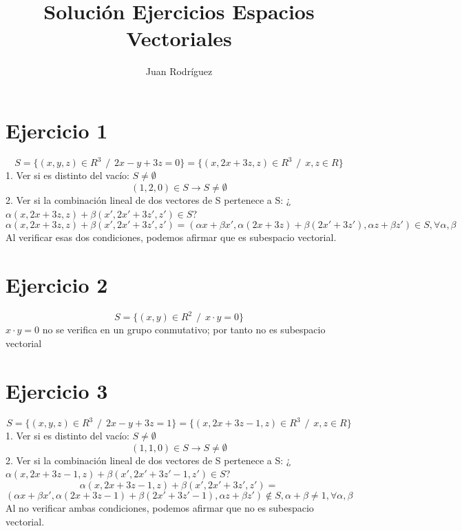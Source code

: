 \documentclass[fleqn]{article}
\title{Solución Ejercicios Espacios Vectoriales}
\author{Juan Rodríguez}
\begin{document}
	\maketitle
	\section{Ejercicio 1}
	\[
	S = \{(x,y,z)\in R^3 \hspace{5pt}/\hspace{5pt}2x - y + 3z = 0\} = \{(x,2x + 3z,z)\in R^3 \hspace{5pt}/\hspace{5pt}x,z \in R\}
	\]
	1. Ver si es distinto del vacío: $S \neq \emptyset$
	\[
	(1,2,0) \in S \rightarrow S \neq \emptyset 
	\]
	2. Ver si la combinación lineal de dos vectores de S pertenece a S: ¿$\alpha(x,2x+3z,z) + \beta(x',2x'+3z',z') \in S$?
	\[
	\alpha(x,2x+3z,z) + \beta(x',2x'+3z',z') = (\alpha x + \beta x', \alpha (2x+3z)+\beta(2x'+3z'),\alpha z + \beta z') \in S, \forall \alpha , \beta
	\]
	Al verificar esas dos condiciones, podemos afirmar que es subespacio vectorial.
	\section{Ejercicio 2}
	\[
	S = \{(x,y)\in R^2 \hspace{5pt}/\hspace{5pt}x \cdot y = 0\}
	\]
	$x \cdot y = 0$ no se verifica en un grupo conmutativo; por tanto no es subespacio vectorial
	\section{Ejercicio 3}
	\[
	S = \{(x,y,z)\in R^3 \hspace{5pt}/\hspace{5pt}2x - y + 3z = 1\} = \{(x,2x + 3z - 1,z)\in R^3 \hspace{5pt}/\hspace{5pt}x,z \in R\}
	\]
	1. Ver si es distinto del vacío: $S \neq \emptyset$
	\[
	(1,1,0) \in S \rightarrow S \neq \emptyset 
	\]
	2. Ver si la combinación lineal de dos vectores de S pertenece a S: ¿$\alpha(x,2x+3z-1,z) + \beta(x',2x'+3z'-1,z') \in S$?
	\[
	\alpha(x,2x+3z-1,z) + \beta(x',2x'+3z',z') =
	\]
	\[
	(\alpha x + \beta x', \alpha (2x+3z-1)+\beta(2x'+3z'-1),\alpha z + \beta z') \notin S, \alpha + \beta \neq 1, \forall \alpha , \beta
	\]
	Al no verificar ambas condiciones, podemos afirmar que no es subespacio vectorial.
\end{document}
